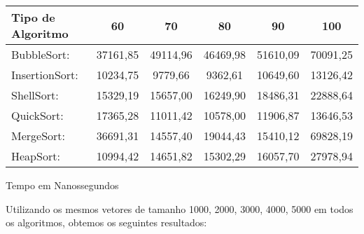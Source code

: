 \documentclass{article}
\begin{document}
\begin{center}
	\vspace{0.5cm}
	\begin{tabular}[htbp]{| l |c |c |c |c |c  |}%
		\hline 
		Tipo de Algoritmo& 60&70&80&90&100\\
		\hline %
		BubbleSort: &37161,85 &49114,96&46469,98& 51610,09&70091,25
		 \\ %
		\hline
		InsertionSort: &10234,75 &9779,66&9362,61&10649,60& 13126,42\\ %
		\hline	
		ShellSort: &15329,19 & 15657,00&16249,90&18486,31&22888,64 \\ %
		\hline	
		QuickSort: &17365,28 &11011,42&10578,00&11906,87& 13646,53\\ %
		\hline	
		MergeSort: & 36691,31&14557,40&19044,43&15410,12&69828,19\\ %
		\hline		
		HeapSort: &10994,42 &14651,82&15302,29&16057,70& 27978,94\\ %
		\hline
		
		
	\end{tabular}
		
			Tempo em Nanossegundos
		
\end{center}	
	
\vspace{0.5cm}
 \indent Utilizando os mesmos vetores de tamanho  1000, 2000, 3000, 4000, 5000 em todos os algoritmos, obtemos os seguintes resultados:
\end{document}
